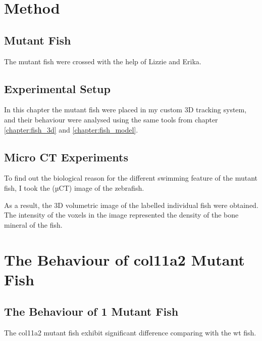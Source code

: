 \documentclass[11pt,twoside]{report}
\begin{document}
\section{Method}

\subsection{Mutant Fish}

The mutant fish were crossed with the help of Lizzie and Erika.

\subsection{Experimental Setup}

In this chapter the mutant fish were placed in my custom 3D tracking system, and their behaviour were analysed using the same tools from chapter \ref{chapter:fish_3d} and \ref{chapter:fish_model}.

\subsection{Micro CT Experiments}

To find out the biological reason for the different swimming feature of the mutant fish, I took the (µCT) image of the {\mf} zebrafish.

As a result, the 3D volumetric image of the labelled individual fish were obtained. The intensity of the voxels in the image represented the density of the bone mineral of the fish.


\section{The Behaviour of col11a2 Mutant Fish}

\subsection{The Behaviour of 1 Mutant Fish}

The col11a2 mutant fish exhibit significant difference comparing with the wt fish.
\end{document}
